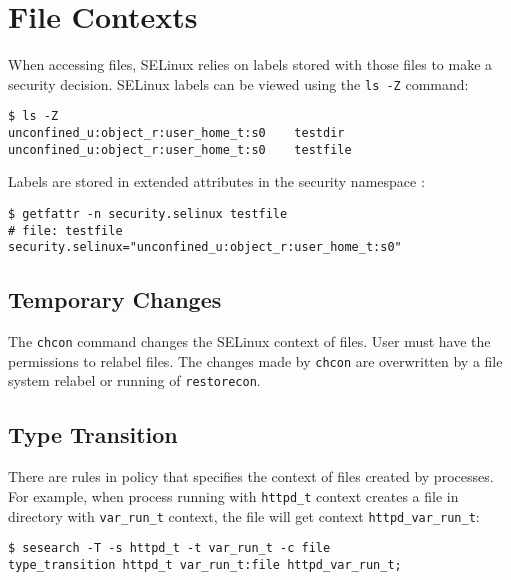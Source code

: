 \section{File Contexts}

When accessing files, SELinux relies on labels stored with those files to make a
security decision. SELinux labels can be viewed using the \texttt{ls -Z}
command:
\begin{lstlisting}
$ ls -Z
unconfined_u:object_r:user_home_t:s0    testdir
unconfined_u:object_r:user_home_t:s0    testfile
\end{lstlisting}
Labels are stored in extended attributes in the security namespace
\cite{xattrman}:
\begin{lstlisting}
$ getfattr -n security.selinux testfile
# file: testfile
security.selinux="unconfined_u:object_r:user_home_t:s0"
\end{lstlisting}

\subsection{Temporary Changes}
The \texttt{chcon} command changes the SELinux context of files. User must have
the permissions to relabel files. The changes made by \texttt{chcon} are
overwritten by a file system relabel or running of \texttt{restorecon}.

\subsection{Type Transition}
There are rules in policy that specifies the context of files created by
processes. For example, when process running with \texttt{httpd\_t} context
creates a file in directory with \texttt{var\_run\_t} context, the file will get
context \texttt{httpd\_var\_run\_t}:
\begin{lstlisting}
$ sesearch -T -s httpd_t -t var_run_t -c file
type_transition httpd_t var_run_t:file httpd_var_run_t;
\end{lstlisting}


